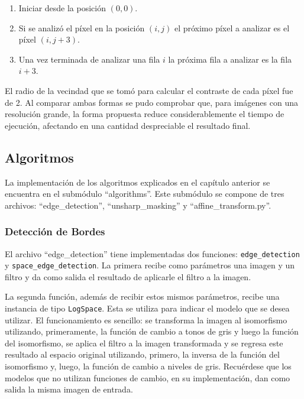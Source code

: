 \begin{enumerate}
	\item Iniciar desde la posici\'on $(0,0)$.
	\item Si se analiz\'o el p\'ixel en la posici\'on $(i,j)$ el pr\'oximo p\'ixel a analizar es el p\'ixel $(i,j+3)$.
	\item Una vez terminada de analizar una fila $i$ la pr\'oxima fila a analizar es la fila $i+3$.
\end{enumerate}

El radio de la vecindad que se tom\'o para calcular el contraste de cada p\'ixel fue de 2. Al comparar ambas formas se pudo comprobar que, para im\'agenes con una resoluci\'on grande, la forma propuesta reduce considerablemente el tiempo de ejecuci\'on, afectando en una cantidad despreciable el resultado final.

\subsection{Algoritmos}

La implementaci\'on de los algoritmos explicados en el cap\'itulo anterior se encuentra en el subm\'odulo ``algorithms''. Este subm\'odulo se compone de tres archivos: ``edge\_detection'', ``unsharp\_masking'' y ``affine\_transform.py''.

\subsubsection{Detecci\'on de Bordes}

El archivo ``edge\_detection'' tiene implementadas dos funciones: \verb|edge_detection| y \verb|space_edge_detection|. La primera recibe como par\'ametros una imagen y un filtro y da como salida el resultado de aplicarle el filtro a la imagen. 

La segunda funci\'on, adem\'as de recibir estos mismos par\'ametros, recibe una instancia de tipo \verb|LogSpace|. Esta se utiliza para indicar el modelo que se desea utilizar. El funcionamiento es sencillo: se transforma la imagen al isomorfismo utilizando, primeramente, la funci\'on de cambio a tonos de gris y luego la funci\'on del isomorfismo, se aplica el filtro a la imagen transformada y se regresa este resultado al espacio original utilizando, primero, la inversa de la funci\'on del isomorfismo y, luego, la funci\'on de cambio a niveles de gris. Recu\'erdese que los modelos que no utilizan funciones de cambio, en su implementaci\'on, dan como salida la misma imagen de entrada.

